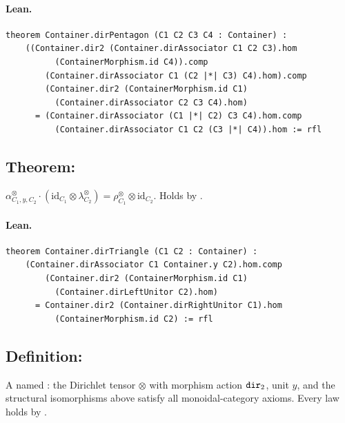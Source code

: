 \documentclass[11pt,a4paper]{article}
\begin{document}
\paragraph{Lean.}
\begin{lstlisting}[style=lean]
theorem Container.dirPentagon (C1 C2 C3 C4 : Container) :
    ((Container.dir2 (Container.dirAssociator C1 C2 C3).hom
          (ContainerMorphism.id C4)).comp
        (Container.dirAssociator C1 (C2 |*| C3) C4).hom).comp
        (Container.dir2 (ContainerMorphism.id C1)
          (Container.dirAssociator C2 C3 C4).hom)
      = (Container.dirAssociator (C1 |*| C2) C3 C4).hom.comp
          (Container.dirAssociator C1 C2 (C3 |*| C4)).hom := rfl
\end{lstlisting}


\subsection{Theorem: }

\begin{thm}
$\alpha^\otimes_{C_1,y,C_2} \cdot (\mathrm{id}_{C_1} \otimes \lambda^\otimes_{C_2})
= \rho^\otimes_{C_1} \otimes \mathrm{id}_{C_2}$.
Holds by .
\end{thm}

\paragraph{Lean.}
\begin{lstlisting}[style=lean]
theorem Container.dirTriangle (C1 C2 : Container) :
    (Container.dirAssociator C1 Container.y C2).hom.comp
        (Container.dir2 (ContainerMorphism.id C1)
          (Container.dirLeftUnitor C2).hom)
      = Container.dir2 (Container.dirRightUnitor C1).hom
          (ContainerMorphism.id C2) := rfl
\end{lstlisting}


\subsection{Definition: }

\begin{defn}
A named : the Dirichlet tensor $\otimes$ with morphism action
$\texttt{dir}_2$, unit $y$, and the structural isomorphisms above satisfy all
monoidal-category axioms.  Every law holds by .
\end{defn}
\end{document}
